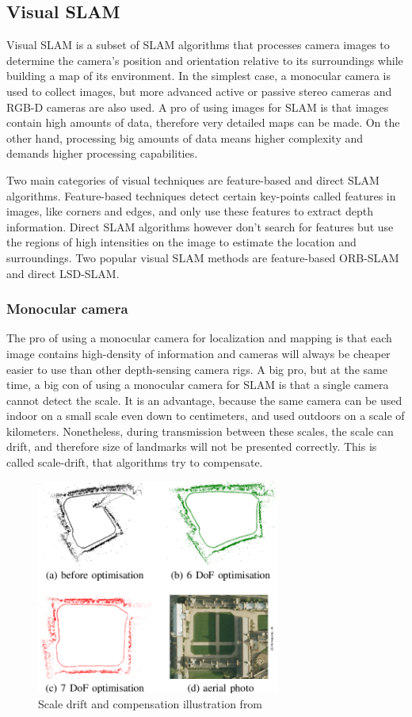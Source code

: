 \subsection{Visual SLAM}
Visual SLAM is a subset of SLAM algorithms that processes camera images to determine the camera's position and orientation
relative to its surroundings while building a map of its environment. In the simplest case, a monocular camera is used
to collect images, but more advanced active or passive stereo cameras and RGB-D cameras are also used. A pro of using
images for SLAM is that images contain high amounts of data, therefore very detailed maps can be made. On the other hand,
processing big amounts of data means higher complexity and demands higher processing capabilities.


Two main categories of visual techniques are feature-based and direct SLAM algorithms. Feature-based techniques detect
certain key-points called features in images, like corners and edges, and only use these features to extract depth information.
Direct SLAM algorithms however don't search for features but use the regions of high intensities on the image to estimate the 
location and surroundings. Two popular visual SLAM methods are feature-based ORB-SLAM and direct LSD-SLAM.

\subsubsection{Monocular camera}
The pro of using a monocular camera for localization and mapping is that each image contains high-density of information and
cameras will always be cheaper easier to use than other depth-sensing camera rigs. 
A big pro, but at the same time, a big con of using a monocular camera for SLAM is that a single camera cannot detect the scale.
It is an advantage, because the same camera can be used indoor on a small scale even down to centimeters, and used outdoors on
a scale of kilometers. Nonetheless, during transmission between these scales, the scale can drift, and therefore size of
landmarks will not be presented correctly. This is called scale-drift, that algorithms try to compensate.

\begin{figure}[!ht]
    \centering
	\includegraphics[width=80mm, keepaspectratio]{figures/scale_drift_lsd_slam.png}
    \caption{Scale drift and compensation illustration from \cite{Strasdat2010ScaleDL}}
    \label{fig:scale_drift_lsd_slam}
\end{figure}


